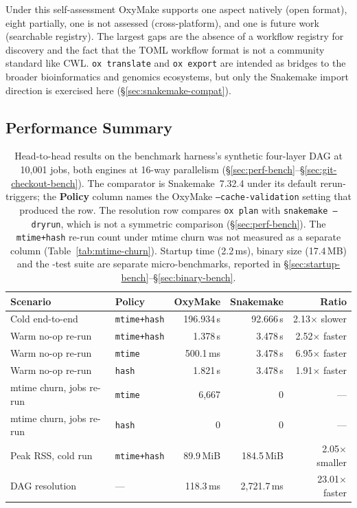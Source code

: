 \documentclass[12pt,a4paper]{article}
\newcommand{\code}[1]{{\texttt{\small\color{inlinecode}#1}}}
\begin{document}
\noindent Under this self-assessment OxyMake supports one aspect
natively (open format), eight partially, one is not assessed
(cross-platform), and one is future work (searchable registry). The
largest gaps are the absence of a workflow
registry for discovery and the fact that the TOML workflow format
is not a community
standard like CWL. \code{ox translate} and \code{ox export} are
intended as bridges to the broader bioinformatics and genomics
ecosystems, but only the Snakemake import direction is exercised here
(\S\ref{sec:snakemake-compat}).

\subsection{Performance Summary}

\begin{table}[htbp]
\centering\small
\begin{tabular}{@{}llrrr@{}}
\toprule
\textbf{Scenario} & \textbf{Policy} & \textbf{OxyMake} & \textbf{Snakemake} & \textbf{Ratio} \\
\midrule
Cold end-to-end          & \code{mtime+hash} & 196.934\,s & 92.666\,s   & 2.13$\times$ slower \\
Warm no-op re-run        & \code{mtime+hash} &   1.378\,s &  3.478\,s   & 2.52$\times$ faster \\
Warm no-op re-run        & \code{mtime}      &  500.1\,ms &  3.478\,s   & 6.95$\times$ faster \\
Warm no-op re-run        & \code{hash}       &   1.821\,s &  3.478\,s   & 1.91$\times$ faster \\
mtime churn, jobs re-run & \code{mtime}      &  6{,}667   &  0          & --- \\
mtime churn, jobs re-run & \code{hash}       &  0         &  0          & --- \\
Peak RSS, cold run       & \code{mtime+hash} &  89.9\,MiB & 184.5\,MiB  & 2.05$\times$ smaller \\
DAG resolution           & ---               &  118.3\,ms & 2{,}721.7\,ms & 23.01$\times$ faster \\
\bottomrule
\end{tabular}
\caption{Head-to-head results on the benchmark harness's synthetic
  four-layer DAG at 10{,}001 jobs, both engines at 16-way parallelism
  (\S\ref{sec:perf-bench}--\S\ref{sec:git-checkout-bench}). The
  comparator is Snakemake~7.32.4 under its default rerun-triggers; the
  \textbf{Policy} column names the OxyMake \code{--cache-validation}
  setting that produced the row. The resolution row compares \code{ox
  plan} with \code{snakemake --dryrun}, which is not a symmetric
  comparison (\S\ref{sec:perf-bench}). The \code{mtime+hash} re-run
  count under mtime churn was not measured as a separate column
  (Table~\ref{tab:mtime-churn}). Startup time (2.2\,ms), binary size
  (17.4\,MB) and the \metricTests-test suite are separate
  micro-benchmarks, reported in
  \S\ref{sec:startup-bench}--\S\ref{sec:binary-bench}.}
\label{tab:perf-summary}
\end{table}
\end{document}
